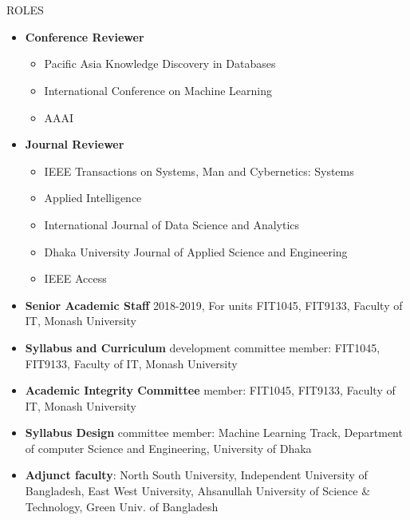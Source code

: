 \documentclass{my_cv}
\begin{document}
\section{\faGroup}{ROLES}
\begin{itemize}[noitemsep]
    \item \textbf{Conference Reviewer} 
        \begin{itemize}[noitemsep]
            \item Pacific Asia Knowledge Discovery in Databases
            \item International Conference on Machine Learning
            \item AAAI
        \end{itemize}
    \item \textbf{Journal Reviewer} 
    \begin{itemize}[noitemsep]
            \item IEEE Transactions on Systems, Man and Cybernetics: Systems
            \item Applied Intelligence
            \item International Journal of Data Science and Analytics
            \item Dhaka University Journal of Applied Science and Engineering
            \item IEEE Access
        \end{itemize}
    \item \textbf{Senior Academic Staff} 2018-2019, For units FIT1045, FIT9133, Faculty of IT, Monash University
    \item \textbf{Syllabus and Curriculum} development committee member: FIT1045, FIT9133, Faculty of IT, Monash University
    \item \textbf{Academic Integrity Committee} member: FIT1045, FIT9133, Faculty of IT, Monash University
    \item \textbf{Syllabus Design} committee member: Machine Learning Track, Department of computer Science and Engineering, University of Dhaka
    \item \textbf{Adjunct faculty}: North South University, Independent University of Bangladesh, East West University, Ahsanullah University of Science \& Technology, Green Univ. of Bangladesh
\end{itemize}
\end{document}
